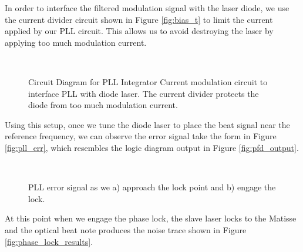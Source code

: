 In order to interface the filtered modulation signal with the laser diode, we
use the current divider circuit shown in Figure \ref{fig:bias_t} to limit the
current applied by our PLL circuit.  This allows us to avoid destroying the
laser by applying too much modulation current.


\begin{figure}[!ht]
  \centering
   \\
   \caption[OPLL integrator and diode current modulation circuits]{ Circuit Diagram for PLL Integrator   Current modulation circuit to interface PLL with diode laser.  The current divider protects the diode from too much modulation current.}
  \label{fig:opll_circuits}
\end{figure}
    

Using this setup, once we tune the diode laser to place the beat signal near the reference frequency, we can observe the error signal take the form in Figure \ref{fig:pll_err}, which resembles the logic diagram output in Figure \ref{fig:pfd_output}.


\begin{figure}[!ht]
  \centering
   \\
  \caption[OPLL error signal]{PLL error signal as we a) approach the lock point and b) engage the lock.}
  \label{fig:pll_error}
\end{figure}


At this point when we engage the phase lock, the slave laser locks to the
Matisse and the optical beat note produces the noise
trace shown in Figure \ref{fig:phase_lock_results}.




